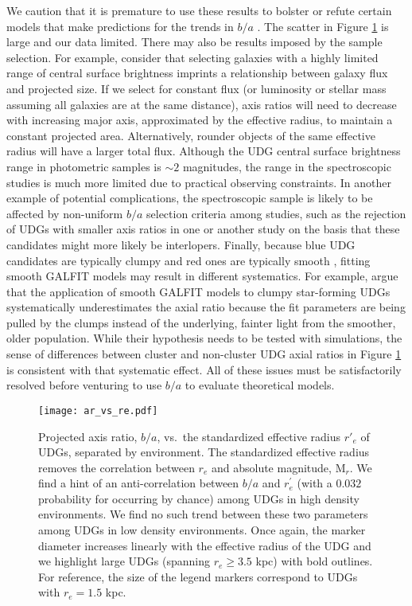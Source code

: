 \documentclass[twocolumn,tighten]{aastex63}
\begin{document}
We caution that it is premature to use these results to bolster or refute certain models that make predictions for the trends in $b/a$ \citep[i.e,][]{Amorisco2016, Posti2018}. The scatter in Figure \ref{fig:ar_vs_re} is large and our data limited.
There may also be results imposed by the sample selection. For example, consider that selecting galaxies with a highly limited range of central surface brightness imprints a relationship between galaxy flux and projected size. If we select for constant flux (or luminosity or stellar mass assuming all galaxies are at the same distance), axis ratios will need to decrease with increasing major axis, approximated by the effective radius, to maintain a constant projected area.
Alternatively, rounder objects of the same effective radius will have a larger total flux. 
Although the UDG central surface brightness range in photometric samples is $\sim2$ magnitudes, the range in the spectroscopic studies is much more limited due to practical observing constraints.
In another example of potential complications, the spectroscopic sample is likely to be affected by non-uniform $b/a$ selection criteria among studies, such as the rejection of UDGs with smaller axis ratios in one or another study on the basis that these candidates might more likely be interlopers.
Finally, because blue UDG candidates are typically clumpy and red ones are typically smooth \citep{karunakaran20}, fitting smooth GALFIT models may result in different systematics. For example, \cite{karunakaran20} argue that the application of smooth GALFIT models to clumpy star-forming UDGs systematically underestimates the axial ratio because the fit parameters are being pulled by the clumps instead of the underlying, fainter light from the smoother, older population. While their hypothesis needs to be tested with simulations, the sense of differences between cluster and non-cluster UDG axial ratios in Figure \ref{fig:ar_vs_re} is consistent with that systematic effect. All of these issues must be satisfactorily resolved before venturing to use $b/a$ to evaluate theoretical models.

\begin{figure}[t]
\texttt{[image: ar\_vs\_re.pdf]}
\caption{Projected axis ratio,  $b/a$, vs.\ the standardized effective radius $r'_e$ of UDGs, separated by environment. The standardized effective radius removes the correlation between $r_e$ and absolute magnitude, $\mathrm{M}_r$. We find a hint of an anti-correlation between $b/a$ and $r^\prime_e$ (with a $0.032$ probability for occurring by chance) 
among UDGs in high density environments. We find no such trend between these two parameters among UDGs in low density environments.
Once again, the marker diameter increases linearly with the effective radius of the UDG and we highlight large UDGs (spanning $r_e \geq 3.5$ kpc) with bold outlines. For reference, the size of the legend markers correspond to UDGs with $r_e=1.5$ kpc.} 
\label{fig:ar_vs_re}
\end{figure}
\end{document}
